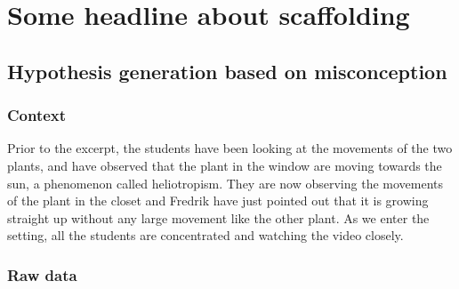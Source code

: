 \section{Some headline about scaffolding}

\subsection{Hypothesis generation based on misconception}


\subsubsection*{Context}
Prior to the excerpt, the students have been looking at the movements of the two plants, and have observed that the plant in the window are moving towards the sun, a phenomenon called heliotropism. They are now observing the movements of the plant in the closet and Fredrik have just pointed out that it is growing straight up without any large movement like the other plant. As we enter the setting, all the students are concentrated and watching the video closely.


\subsubsection*{Raw data}

